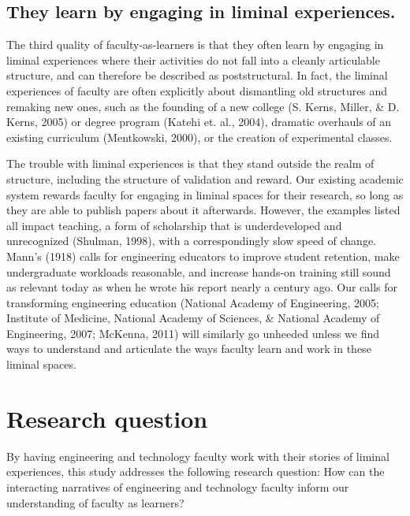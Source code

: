 \subsection{They learn by engaging in liminal experiences.}

The third quality of faculty-as-learners is that they often learn by engaging in liminal experiences where their activities do not fall into a cleanly articulable structure, and can therefore be described as poststructural. In fact, the liminal experiences of faculty are often explicitly about dismantling old structures and remaking new ones, such as the founding of a new college (S. Kerns, Miller, & D. Kerns, 2005) or degree program (Katehi et. al., 2004), dramatic overhauls of an existing curriculum (Mentkowski, 2000), or the creation of experimental classes.

The trouble with liminal experiences is that they stand outside the realm of structure, including the structure of validation and reward. Our existing academic system rewards faculty for engaging in liminal spaces for their research, so long as they are able to publish papers about it afterwards. However, the examples listed all impact teaching, a form of scholarship that is underdeveloped and unrecognized (Shulman, 1998), with a correspondingly slow speed of change. Mann’s (1918) calls for engineering educators to improve student retention, make undergraduate workloads reasonable, and increase hands-on training still sound as relevant today as when he wrote his report nearly a century ago. Our calls for transforming engineering education (National Academy of Engineering, 2005; Institute of Medicine, National Academy of Sciences, & National Academy of Engineering, 2007; McKenna, 2011) will similarly go unheeded unless we find ways to understand and articulate the ways faculty learn and work in these liminal spaces.

\section{Research question}

By having engineering and technology faculty work with their stories of liminal experiences, this study addresses the following research question: How can the interacting narratives of engineering and technology faculty inform our understanding of faculty as learners?
